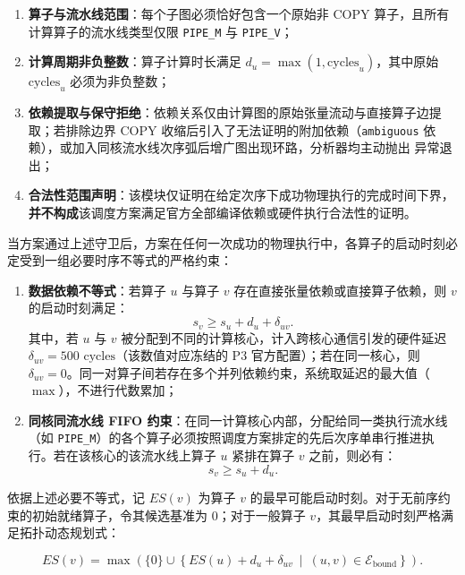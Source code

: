 \documentclass[anonymous,withtoc]{gmcm2026}
\providecommand{\tightlist}{\setlength{\itemsep}{0pt}\setlength{\parskip}{0pt}}
\begin{document}
\begin{enumerate}
\def\labelenumi{\arabic{enumi}.}
\tightlist
\item
  \textbf{算子与流水线范围}：每个子图必须恰好包含一个原始非 COPY 算子，且所有计算算子的流水线类型仅限 \texttt{PIPE\_M} 与 \texttt{PIPE\_V}；
\item
  \textbf{计算周期非负整数}：算子计算时长满足 \(d_u = \max(1, \text{cycles}_u)\)，其中原始 \(\text{cycles}_u\) 必须为非负整数；
\item
  \textbf{依赖提取与保守拒绝}：依赖关系仅由计算图的原始张量流动与直接算子边提取；若排除边界 COPY 收缩后引入了无法证明的附加依赖（\texttt{ambiguous} 依赖），或加入同核流水线次序弧后增广图出现环路，分析器均主动抛出 \texttt{} 异常退出；
\item
  \textbf{合法性范围声明}：该模块仅证明在给定次序下成功物理执行的完成时间下界，\textbf{并不构成}该调度方案满足官方全部编译依赖或硬件执行合法性的证明。
\end{enumerate}

当方案通过上述守卫后，方案在任何一次成功的物理执行中，各算子的启动时刻必定受到一组必要时序不等式的严格约束：

\begin{enumerate}
\def\labelenumi{\arabic{enumi}.}
\tightlist
\item
  \textbf{数据依赖不等式}：若算子 \(u\) 与算子 \(v\) 存在直接张量依赖或直接算子依赖，则 \(v\) 的启动时刻满足： \begin{equation}
s_v \ge s_u + d_u + \delta_{uv}.
\end{equation} 其中，若 \(u\) 与 \(v\) 被分配到不同的计算核心，计入跨核心通信引发的硬件延迟 \(\delta_{uv} = 500\text{ cycles}\)（该数值对应冻结的 P3 官方配置）；若在同一核心，则 \(\delta_{uv} = 0\)。同一对算子间若存在多个并列依赖约束，系统取延迟的最大值（\(\max\)），不进行代数累加；
\item
  \textbf{同核同流水线 FIFO 约束}：在同一计算核心内部，分配给同一类执行流水线（如 \texttt{PIPE\_M}）的各个算子必须按照调度方案排定的先后次序单串行推进执行。若在该核心的该流水线上算子 \(u\) 紧排在算子 \(v\) 之前，则必有： \begin{equation}
s_v \ge s_u + d_u.
\end{equation}
\end{enumerate}

依据上述必要不等式，记 \(ES(v)\) 为算子 \(v\) 的最早可能启动时刻。对于无前序约束的初始就绪算子，令其候选基准为 0；对于一般算子 \(v\)，其最早启动时刻严格满足拓扑动态规划式：

\begin{equation}
ES(v) = \max \left( \{0\} \cup \left\{ ES(u) + d_u + \delta_{uv} \ \middle|\ (u, v) \in \mathcal{E}_{\mathrm{bound}} \right\} \right).
\end{equation}
\end{document}
